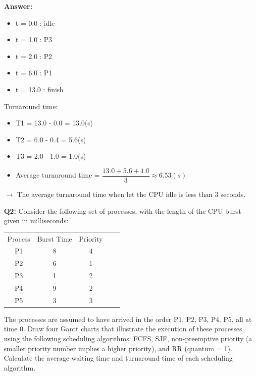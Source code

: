 \documentclass[a4paper]{article}
\newcommand{\tf}{\textbf}
\begin{document}
\begin{enumerate}[label=\alph*]
    \tf{Answer: } \\
    \begin{itemize}
        \item t = 0.0 : idle
        \item t = 1.0 : P3
        \item t = 2.0 : P2
        \item t = 6.0 : P1
        \item t = 13.0 : finish
    \end{itemize}

    \par{Turnaround time: } \\
    \begin{itemize}
        \item T1 = 13.0 - 0.0 = 13.0(s)
        \item T2 = 6.0 - 0.4 = 5.6(s)
        \item T3 = 2.0 - 1.0 = 1.0(s)
        \item Average turnaround time = $\dfrac{13.0 + 5.6 + 1.0}{3} \approx 6.53(s)$
    \end{itemize}

    $\rightarrow$ The average turnaround time when let the CPU idle is less than 3 seconds.
\end{enumerate}

\tf{Q2:} Consider the following set of processes, with the length of the CPU burst given in milliseconds: \\

\begin{table}[h!]
    \centering
    \begin{tabular}{c|c|cll}
    Process & Burst Time & Priority &  &  \\ \cline{1-3}
    P1      & 8          & 4        &  &  \\
    P2      & 6          & 1        &  &  \\
    P3      & 1          & 2        &  &  \\
    P4      & 9          & 2        &  &  \\
    P5      & 3          & 3        &  & 
    \end{tabular}
\end{table}

\par{The processes are assumed to have arrived in the order P1, P2, P3, P4, P5, all at time 0. Draw four Gantt
charts that illustrate the execution of these processes using the following scheduling algorithms: FCFS,
SJF, non-preemptive priority (a smaller priority number implies a higher priority), and RR (quantum = 1).
Calculate the average waiting time and turnaround time of each scheduling algorithm.} \\
\end{document}
